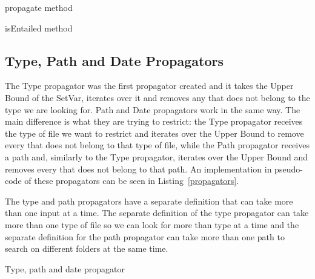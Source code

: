 \begin{algorithm}
    \caption{propagate method}
    \label{propagate}
    \begin{algorithmic}
            \EndIf
        \EndFor
    \end{algorithmic}
\end{algorithm}

\begin{algorithm}
    \caption{isEntailed method}
    \label{isEntailed}
    \begin{algorithmic}
        \Else
        \EndIf
    \end{algorithmic}
\end{algorithm}

\subsection{Type, Path and Date Propagators}

The Type propagator was the first propagator created and it takes the Upper Bound of the SetVar, iterates over it and removes any \INODE that does not belong to the type we are looking for. Path and Date propagators work in the same way. The main difference is what they are trying to restrict: the Type propagator receives the type of file we want to restrict and iterates over the Upper Bound to remove every \INODE that does not belong to that type of file, while the Path propagator receives a path and, similarly to the Type propagator, iterates over the Upper Bound and removes every \INODE that does not belong to that path. An implementation in pseudo-code of these propagators can be seen in Listing~\ref{propagators}.

The type and path propagators have a separate definition that can take more than one input at a time. The separate definition of the type propagator can take more than one type of file so we can look for more than type at a time and the separate definition for the path propagator can take more than one path to search on different folders at the same time.

\begin{algorithm}
    \caption{Type, path and date propagator}
    \label{propagators}
    \begin{algorithmic}
            \EndIf
        \EndFor
    \end{algorithmic}
\end{algorithm}

